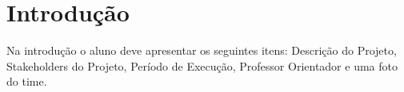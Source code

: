 \section[Introdução]{Introdução}

  Na introdução o aluno deve apresentar os seguintes itens: Descrição do Projeto,
Stakeholders do Projeto, Período de Execução, Professor Orientador e uma foto do
time.